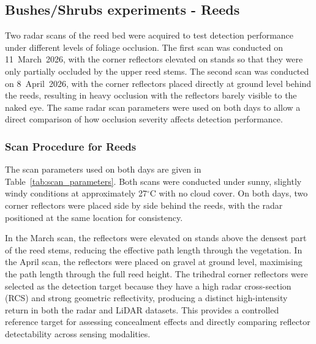 

\subsection{Bushes/Shrubs experiments - Reeds}

Two radar scans of the reed bed were acquired to test detection performance
under different levels of foliage occlusion.
The first scan was conducted on 11~March~2026, with the corner reflectors
elevated on stands so that they were only partially occluded by the upper
reed stems.
The second scan was conducted on 8~April~2026, with the corner reflectors
placed directly at ground level behind the reeds, resulting in heavy occlusion
with the reflectors barely visible to the naked eye.
The same radar scan parameters were used on both days to allow a direct
comparison of how occlusion severity affects detection performance.

\subsubsection{Scan Procedure for Reeds}

The scan parameters used on both days are given in Table~\ref{tab:scan_parameters}.
Both scans were conducted under sunny, slightly windy conditions at approximately
27$^\circ$C with no cloud cover.
On both days, two corner reflectors were placed side by side behind the reeds,
with the radar positioned at the same location for consistency.

In the March scan, the reflectors were elevated on stands above the densest part
of the reed stems, reducing the effective path length through the vegetation.
In the April scan, the reflectors were placed on gravel at ground level,
maximising the path length through the full reed height.
The trihedral corner reflectors were selected as the detection target because
they have a high radar cross-section (RCS) and strong geometric reflectivity,
producing a distinct high-intensity return in both the radar and LiDAR datasets.
This provides a controlled reference target for assessing concealment effects and
directly comparing reflector detectability across sensing modalities.

